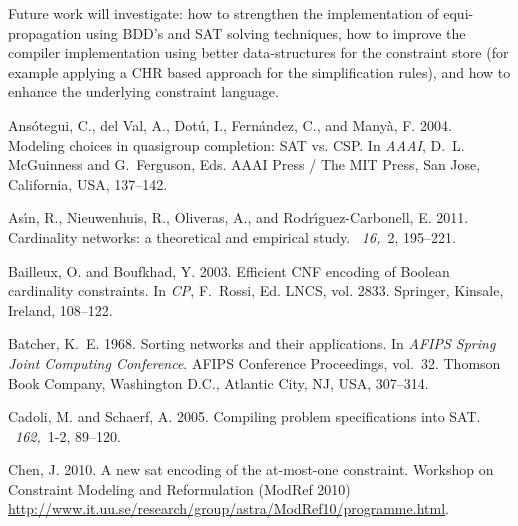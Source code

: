 \documentclass{tlp}
\begin{document}
Future work will investigate: how to strengthen the implementation of
equi-propagation using BDD's and SAT solving techniques, how to
improve the compiler implementation using better data-structures for
the constraint store (for example applying a CHR based approach for
the simplification rules), and how to enhance the underlying
constraint language.


\begin{thebibliography}{}

{\sc Ans{\'o}tegui, C.}, {\sc del Val, A.}, {\sc Dot{\'u}, I.}, {\sc
  Fern{\'a}ndez, C.}, {\sc and} {\sc Many{\`a}, F.} 2004.
\newblock Modeling choices in quasigroup completion: {SAT} vs. {CSP}.
\newblock In {\em AAAI}, {D.~L. McGuinness} {and} {G.~Ferguson}, Eds. AAAI
  Press / The MIT Press, San Jose, California, USA, 137--142.

{\sc As\'{\i}n, R.}, {\sc Nieuwenhuis, R.}, {\sc Oliveras, A.}, {\sc and} {\sc
  Rodr\'{\i}guez-Carbonell, E.} 2011.
\newblock Cardinality networks: a theoretical and empirical study.
~{\em 16,\/}~2, 195--221.

{\sc Bailleux, O.} {\sc and} {\sc Boufkhad, Y.} 2003.
\newblock Efficient {CNF} encoding of {B}oolean cardinality constraints.
\newblock In {\em CP}, {F.~Rossi}, Ed. LNCS, vol. 2833. Springer, Kinsale,
  Ireland, 108--122.

{\sc Batcher, K.~E.} 1968.
\newblock Sorting networks and their applications.
\newblock In {\em AFIPS Spring Joint Computing Conference}. AFIPS Conference
  Proceedings, vol.~32. Thomson Book Company, Washington D.C., Atlantic City,
  NJ, USA, 307--314.

{\sc Cadoli, M.} {\sc and} {\sc Schaerf, A.} 2005.
\newblock Compiling problem specifications into {SAT}.
~{\em 162,\/}~1-2, 89--120.

{\sc Chen, J.} 2010.
\newblock A new sat encoding of the at-most-one constraint.
\newblock Workshop on Constraint Modeling and Reformulation (ModRef 2010)
  \url{http://www.it.uu.se/research/group/astra/ModRef10/programme.html}.


\end{thebibliography}
\end{document}
